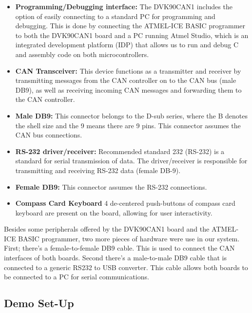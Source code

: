 \begin{itemize}
	\item \textbf{Programming/Debugging interface:} The DVK90CAN1 includes the option of easily connecting to a standard PC for programming and debugging. This is done by connecting the ATMEL-ICE BASIC programmer to both the DVK90CAN1 board and a PC running Atmel Studio, which is an integrated development platform (IDP) that allows us to run and debug C and assembly code on both microcontrollers.
	
	\item \textbf{CAN Transceiver:} This device functions as a transmitter and receiver by transmitting messages from the CAN controller on to the CAN bus (male DB9), as well as receiving incoming CAN messages and forwarding them to the CAN controller. 
	
	\item \textbf{Male DB9:} This connector belongs to the D-sub series, where the B denotes the shell size and the 9 means there are 9 pins. This connector assumes the CAN bus connections.
	
	\item \textbf{RS-232 driver/receiver:} Recommended standard 232 (RS-232) is a standard for serial transmission of data. The driver/receiver is responsible for transmitting and receiving RS-232 data (female DB-9).
	
	\item \textbf{Female DB9:} This connector assumes the RS-232 connections.
	
	\item \textbf{Compass Card Keyboard} 4 de-centered push-buttons of compass card keyboard are present on the board, allowing for user interactivity.
\end{itemize}
Besides some peripherals offered by the DVK90CAN1 board and the ATMEL-ICE BASIC programmer, two more pieces of hardware were use in our system. First; there's a female-to-female DB9 cable. This is used to connect the CAN interfaces of both boards. Second there's a male-to-male DB9 cable that is connected to a generic RS232 to USB converter. This cable allows both boards to be connected to a PC for serial communications.

\subsection{Demo Set-Up}
\label{sec:demo_setup}

